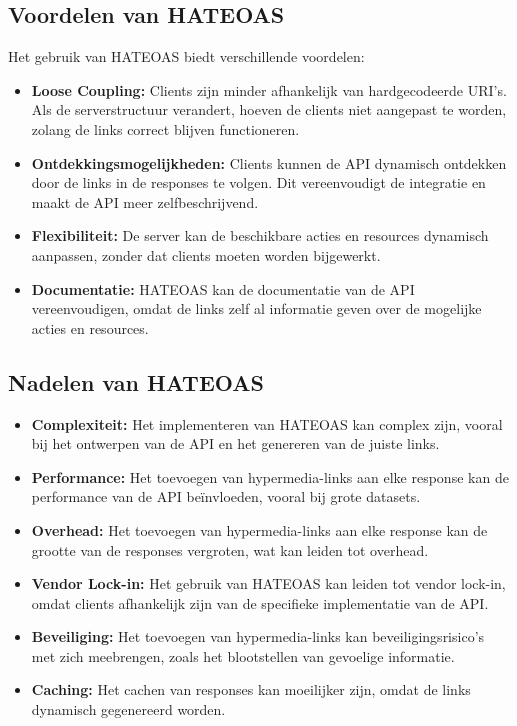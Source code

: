 \subsection{Voordelen van HATEOAS}

Het gebruik van HATEOAS biedt verschillende voordelen:

\begin{itemize}
  \item \textbf{Loose Coupling:} Clients zijn minder afhankelijk van hardgecodeerde URI's. Als de serverstructuur verandert, hoeven de clients niet aangepast te worden, zolang de links correct blijven functioneren.
  \item \textbf{Ontdekkingsmogelijkheden:} Clients kunnen de API dynamisch ontdekken door de links in de responses te volgen. Dit vereenvoudigt de integratie en maakt de API meer zelfbeschrijvend.
  \item \textbf{Flexibiliteit:} De server kan de beschikbare acties en resources dynamisch aanpassen, zonder dat clients moeten worden bijgewerkt.
  \item \textbf{Documentatie:} HATEOAS kan de documentatie van de API vereenvoudigen, omdat de links zelf al informatie geven over de mogelijke acties en resources.
\end{itemize}

\subsection{Nadelen van HATEOAS}

\begin{itemize}
  \item \textbf{Complexiteit:} Het implementeren van HATEOAS kan complex zijn, vooral bij het ontwerpen van de API en het genereren van de juiste links.
  \item \textbf{Performance:} Het toevoegen van hypermedia-links aan elke response kan de performance van de API beïnvloeden, vooral bij grote datasets.
  \item \textbf{Overhead:} Het toevoegen van hypermedia-links aan elke response kan de grootte van de responses vergroten, wat kan leiden tot overhead.
  \item \textbf{Vendor Lock-in:} Het gebruik van HATEOAS kan leiden tot vendor lock-in, omdat clients afhankelijk zijn van de specifieke implementatie van de API.
  \item \textbf{Beveiliging:} Het toevoegen van hypermedia-links kan beveiligingsrisico's met zich meebrengen, zoals het blootstellen van gevoelige informatie.
  \item \textbf{Caching:} Het cachen van responses kan moeilijker zijn, omdat de links dynamisch gegenereerd worden.
\end{itemize}

